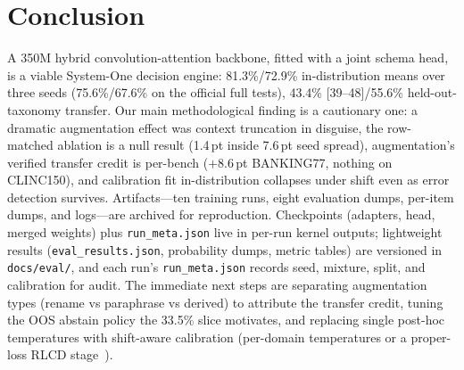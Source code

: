 \section{Conclusion}
A 350M hybrid convolution-attention backbone, fitted with a joint schema head,
is a viable System-One decision engine: 81.3\%/72.9\% in-distribution means
over three seeds (75.6\%/67.6\% on the official full tests),
43.4\% [39--48]/55.6\% held-out-taxonomy transfer. Our main methodological finding is a cautionary
one: a dramatic augmentation effect was context truncation in disguise, the
row-matched ablation is a null result (1.4\,pt inside 7.6\,pt seed spread),
augmentation's verified transfer credit is per-bench ($+$8.6\,pt BANKING77,
nothing on CLINC150), and
calibration fit in-distribution collapses under shift even as error detection
survives. Artifacts---ten training runs, eight evaluation dumps, per-item
dumps, and logs---are archived for reproduction. Checkpoints (adapters, head,
merged weights) plus \texttt{run\_meta.json} live in per-run kernel outputs;
lightweight results (\texttt{eval\_results.json}, probability dumps, metric
tables) are versioned in \texttt{docs/eval/}, and each run's
\texttt{run\_meta.json} records seed, mixture, split, and calibration for audit. The immediate next steps are separating augmentation types
(rename vs paraphrase vs derived) to attribute the transfer credit, tuning
the OOS abstain policy the 33.5\% slice motivates, and replacing single post-hoc
temperatures with shift-aware calibration (per-domain temperatures or a
proper-loss RLCD stage~\cite{gao2026openjev}).
